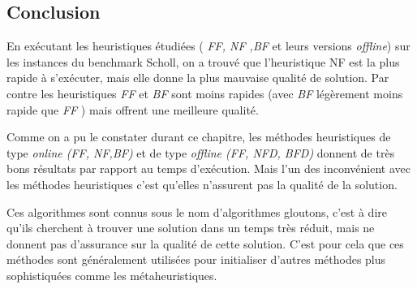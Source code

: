 \documentclass[class=article, crop=false]{standalone}
\begin{document}
\subsection{Conclusion}
En exécutant les heuristiques étudiées ( \emph{FF, NF ,BF} et leurs versions \emph{offline}) sur les instances du benchmark Scholl, on a trouvé que l’heuristique NF est la plus rapide à s’exécuter, mais elle donne la plus mauvaise qualité de solution. Par contre les heuristiques \emph{FF} et \emph{BF} sont moins rapides (avec \emph{BF} légèrement moins rapide que \emph{FF} )  mais offrent une meilleure qualité.  

Comme on a pu le constater durant ce chapitre, les méthodes heuristiques de type \emph{online (FF, NF,BF)} et de type \emph{offline (FF, NFD, BFD)} donnent de très bons résultats par rapport au temps d’exécution. Mais l’un des inconvénient avec les méthodes heuristiques c’est qu’elles n'assurent pas la qualité de la solution.

Ces algorithmes sont connus sous le nom d’algorithmes gloutons, c’est à dire qu’ils cherchent à trouver une solution dans un temps très réduit, mais ne donnent pas d’assurance sur la qualité de cette solution. C’est pour cela que ces méthodes sont généralement utilisées pour initialiser d’autres méthodes plus sophistiquées comme les métaheuristiques.
\end{document}
